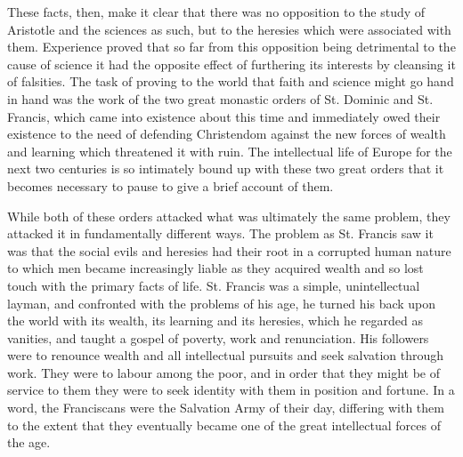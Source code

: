 \documentclass{book}
\begin{document}
These facts, then, make it clear that there was no opposition to the study of Aristotle and the sciences as such, but to the heresies which were associated with them. Experience proved that so far from this opposition being detrimental to the cause of science it had the opposite effect of furthering its interests by cleansing it of falsities. The task of proving to the world that faith and science might go hand in hand was the work of the two great monastic orders of St. Dominic and St. Francis, which came into existence about this time and immediately owed their existence to the need of defending Christendom against the new forces of wealth and learning which threatened it with ruin. The intellectual life of Europe for the next two centuries is so intimately bound up with these two great orders that it becomes necessary to pause to give a brief account of them.

While both of these orders attacked what was ultimately the same problem, they attacked it in fundamentally different ways. The problem as St. Francis saw it was that the social evils and heresies had their root in a corrupted human nature to which men became increasingly liable as they acquired wealth and so lost touch with the primary facts of life. St. Francis was a simple, unintellectual layman, and confronted with the problems of his age, he turned his back upon the world with its wealth, its learning and its heresies, which he regarded as vanities, and taught a gospel of poverty, work and renunciation. His followers were to renounce wealth and all intellectual pursuits and seek salvation through work. They were to labour among the poor, and in order that they might be of service to them they were to seek identity with them in position and fortune. In a word, the Franciscans were the Salvation Army of their day, differing with them to the extent that they eventually became one of the great intellectual forces of the age.
\end{document}
